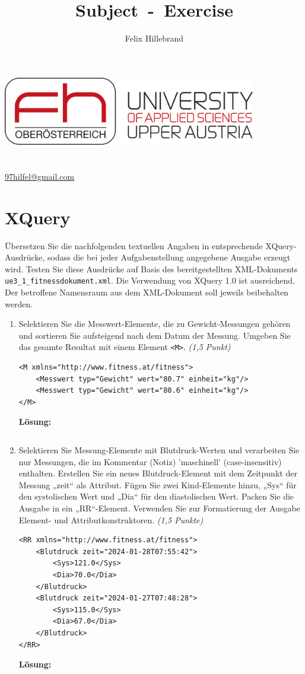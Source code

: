 \documentclass[a4paper,11pt]{report}
\author{Felix Hillebrand}
\makeatletter
\newcommand{\coverpage}{
    \thispagestyle{cover}
    \begin{center}
        {\includegraphics[height=3cm]{fh-logo}}\\[1cm]
        {\LARGE \thetitle}\\[0.5cm]
        {\large \theauthor}\\
        \href{mailto:97hilfel@gmail.com}{97hilfel@gmail.com}\\
    \end{center}
    \tableofcontents
    \clearpage
}
\makeatother
\begin{document}
\title{Subject~-~Exercise}
\coverpage

\clearpage
{}
\pagestyle{main}

\chapter{XQuery}
    Übersetzen Sie die nachfolgenden textuellen Angaben in entsprechende XQuery-Ausdrücke,
    sodass die bei jeder Aufgabenstellung angegebene Ausgabe erzeugt wird. 
    Testen Sie diese Ausdrücke auf Basis des bereitgestellten XML-Dokuments \texttt{ue3\_1\_fitnessdokument.xml}. 
    Die Verwendung von XQuery 1.0 ist ausreichend. 
    Der betroffene Namensraum aus dem XML-Dokument soll jeweils beibehalten werden.

    \begin{enumerate}[1.]
    \item Selektieren Sie die Messwert-Elemente,
    die zu Gewicht-Messungen gehören und sortieren Sie aufsteigend nach dem Datum der Messung.
    Umgeben Sie das gesamte Resultat mit einem Element \texttt{<M>}.
    \textit{(1,5 Punkt)}

    \begin{verbatim}
<M xmlns="http://www.fitness.at/fitness">
    <Messwert typ="Gewicht" wert="80.7" einheit="kg"/>
    <Messwert typ="Gewicht" wert="80.6" einheit="kg"/>
</M>
    \end{verbatim}
    \textbf{Lösung:}
    \inputminted[frame=lines, breaklines, linenos]{xquery}{assets/ue3_1_1.xq}
    \newpage

    \item Selektieren Sie Messung-Elemente mit Blutdruck-Werten und verarbeiten Sie nur
    Messungen, die im Kommentar (Notiz) 'maschinell' (case-insensitiv) enthalten. Erstellen
    Sie ein neues Blutdruck-Element mit dem Zeitpunkt der Messung „zeit“ als Attribut.
    Fügen Sie zwei Kind-Elemente hinzu, „Sys“ für den systolischen Wert und „Dia“ für den
    diastolischen Wert. Packen Sie die Ausgabe in ein „RR“-Element. Verwenden Sie zur
    Formatierung der Ausgabe Element- und Attributkonstruktoren. \textit{(1,5 Punkte)}
    \begin{verbatim}
<RR xmlns="http://www.fitness.at/fitness">
    <Blutdruck zeit="2024-01-28T07:55:42">
        <Sys>121.0</Sys>
        <Dia>70.0</Dia>
    </Blutdruck>
    <Blutdruck zeit="2024-01-27T07:48:28">
        <Sys>115.0</Sys>
        <Dia>67.0</Dia>
    </Blutdruck>
</RR>
    \end{verbatim}
    \textbf{Lösung:}
    \inputminted[frame=lines, breaklines, linenos]{xquery}{assets/ue3_1_2.xq}
    \newpage


\end{enumerate}
\end{document}
